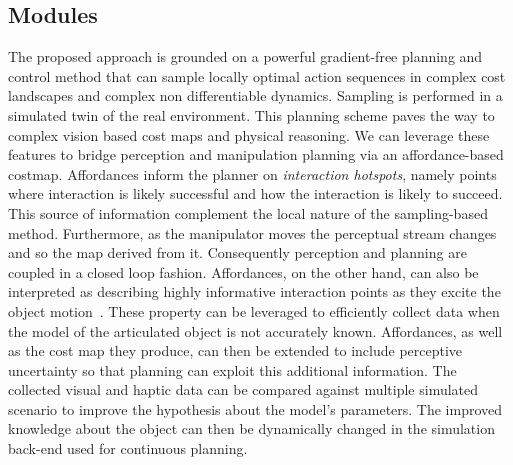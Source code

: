 \subsection{Modules}
The proposed approach is grounded on a powerful gradient-free planning and control method that can sample locally optimal action sequences in complex cost landscapes and complex non differentiable dynamics. Sampling is performed in a simulated twin of the real environment. This planning scheme paves the way to complex vision based cost maps and physical reasoning. We can leverage these features to bridge perception and manipulation planning via an affordance-based costmap. Affordances inform the planner on \emph{interaction hotspots}, namely points where interaction is likely successful and how the interaction is likely to succeed. This source of information complement the local nature of the sampling-based method. Furthermore, as the manipulator moves the perceptual stream changes and so the map derived from it. Consequently perception and planning are coupled in a closed loop fashion. Affordances, on the other hand, can also be interpreted as describing highly informative interaction points as they excite the object motion~\cite{eppner2018physics}. These property can be leveraged to efficiently collect data when the model of the articulated object is not accurately known. Affordances, as well as the cost map they produce, can then be extended to include perceptive uncertainty so that planning can exploit this additional information. The collected visual and haptic data can be compared against multiple simulated scenario to improve the hypothesis about the model's parameters. The improved knowledge about the object can then be dynamically changed in the simulation back-end used for continuous planning. 

